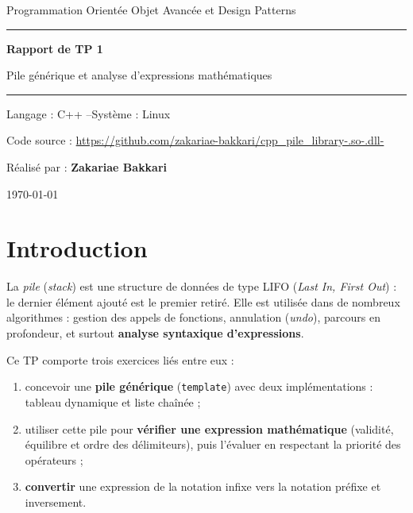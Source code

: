 \documentclass[11pt,a4paper]{article}
\newcommand{\code}[1]{\texttt{#1}}
\begin{document}
\begin{titlepage}
  \centering
  \vspace*{2cm}
  {\large Programmation Orientée Objet Avancée et Design Patterns\par}
  \vspace{1.5cm}
  \rule{\linewidth}{0.6pt}\par\vspace{0.4cm}
  {\Huge\bfseries Rapport de TP 1\par}
  \vspace{0.3cm}
  {\LARGE Pile générique et analyse d'expressions mathématiques\par}
  \vspace{0.4cm}
  \rule{\linewidth}{0.6pt}\par
  \vspace{1.5cm}
  {\large Langage : C++ \quad--\quad Système : Linux\par}
  \vspace{0.4cm}
  {\normalsize Code source : \url{https://github.com/zakariae-bakkari/cpp_pile_library-.so-.dll-}\par}
  \vfill
  {\large Réalisé par : \textbf{Zakariae Bakkari}\par}
  \vspace{1cm}
  {\large \today\par}
\end{titlepage}

\tableofcontents
\newpage

\section{Introduction}

La \emph{pile} (\emph{stack}) est une structure de données de type LIFO
(\emph{Last In, First Out}) : le dernier élément ajouté est le premier retiré.
Elle est utilisée dans de nombreux algorithmes : gestion des appels de fonctions,
annulation (\emph{undo}), parcours en profondeur, et surtout
\textbf{analyse syntaxique d'expressions}.

Ce TP comporte trois exercices liés entre eux :
\begin{enumerate}
  \item concevoir une \textbf{pile générique} (\code{template}) avec deux
        implémentations : tableau dynamique et liste chaînée ;
  \item utiliser cette pile pour \textbf{vérifier une expression mathématique}
        (validité, équilibre et ordre des délimiteurs), puis l'évaluer en
        respectant la priorité des opérateurs ;
  \item \textbf{convertir} une expression de la notation infixe
        vers la notation préfixe et inversement.
\end{enumerate}
\end{document}

